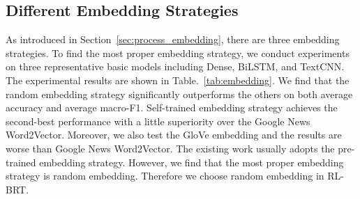 \subsection{Different Embedding Strategies}
As introduced in Section~\ref{sec:process_embedding}, there are three embedding strategies. To find the most proper embedding strategy, we conduct experiments on three representative basic models including Dense, BiLSTM, and TextCNN. The experimental results are shown in Table.~\ref{tab:embedding}. We find that the random embedding strategy significantly outperforms the others on both average accuracy and average macro-F1. Self-trained embedding strategy achieves the second-best performance with a little superiority over the Google News Word2Vector. Moreover, we also test the GloVe embedding and the results are worse than Google News Word2Vector. The existing work usually adopts the pre-trained embedding strategy. However, we find that the most proper embedding strategy is random embedding. Therefore we choose random embedding in RL-BRT.

\begin{table}[htbp]
	\caption{Results of Different Embedding Strategies}
	\centering
	\label{tab:embedding}
\end{table}

